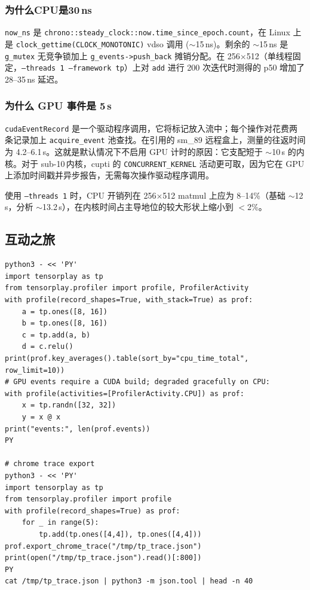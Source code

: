 \subsubsection{为什么CPU是30\,ns}

\texttt{now\_ns} 是 \texttt{chrono::steady\_clock::now.time\_since\_epoch.count}，在 Linux 上是 \texttt{clock\_gettime(CLOCK\_MONOTONIC)} vdso 调用 ($\sim$15\,ns)。剩余的 $\sim$15\,ns 是 \texttt{g\_mutex} 无竞争锁加上 \texttt{g\_events->push\_back} 摊销分配。在 256$\times$512（单线程固定，\texttt{--threads 1 --framework tp}）上对 \texttt{add} 进行 200 次迭代时测得的 p50 增加了 28--35\,ns 延迟。

\subsubsection{为什么 GPU 事件是 5\,\textmu s}

\texttt{cudaEventRecord} 是一个驱动程序调用，它将标记放入流中；每个操作对花费两条记录加上 \texttt{acquire\_event} 池查找。在引用的 sm\_89 远程盒上，测量的往返时间为 4.2--6.1\,\textmu s。这就是默认情况下不启用 GPU 计时的原因：它支配短于 $\sim$10\,\textmu s 的内核。对于 sub-10\,\textmu 内核，\ac{cupti} 的 \texttt{CONCURRENT\_KERNEL} 活动更可取，因为它在 GPU 上添加时间戳并异步报告，无需每次操作驱动程序调用。

使用 \texttt{--threads 1} 时，CPU 开销列在 256$\times$512 matmul 上应为 8--14\%（基础 $\sim$12\,\textmu s，分析 $\sim$13.2\,\textmu s），在内核时间占主导地位的较大形状上缩小到 $<$2\%。

\subsection{互动之旅}

\begin{lstlisting}[caption={Profiling a few ops from Python (no GPU required).}, label=lst:smoketest, style=pystyle]
python3 - << 'PY'
import tensorplay as tp
from tensorplay.profiler import profile, ProfilerActivity
with profile(record_shapes=True, with_stack=True) as prof:
    a = tp.ones([8, 16])
    b = tp.ones([8, 16])
    c = tp.add(a, b)
    d = c.relu()
print(prof.key_averages().table(sort_by="cpu_time_total", row_limit=10))
# GPU events require a CUDA build; degraded gracefully on CPU:
with profile(activities=[ProfilerActivity.CPU]) as prof:
    x = tp.randn([32, 32])
    y = x @ x
print("events:", len(prof.events))
PY

# chrome trace export
python3 - << 'PY'
import tensorplay as tp
from tensorplay.profiler import profile
with profile(record_shapes=True) as prof:
    for _ in range(5):
        tp.add(tp.ones([4,4]), tp.ones([4,4]))
prof.export_chrome_trace("/tmp/tp_trace.json")
print(open("/tmp/tp_trace.json").read()[:800])
PY
cat /tmp/tp_trace.json | python3 -m json.tool | head -n 40
\end{lstlisting}

